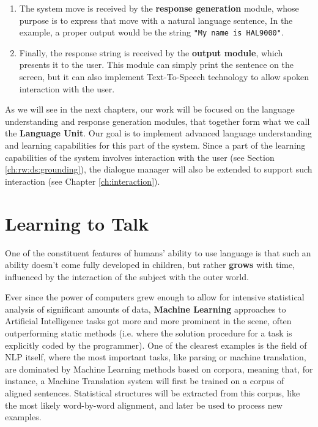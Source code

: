 \begin{enumerate}
	\item The system move is received by the \textbf{response generation} module, whose purpose is to express that move with a natural language sentence, In the example, a proper output would be the string \texttt{"My name is HAL9000"}.
	\item Finally, the response string is received by the \textbf{output module}, which presents it to the user. This module can simply print the sentence on the screen, but it can also implement Text-To-Speech technology to allow spoken interaction with the user.
\end{enumerate}

As we will see in the next chapters, our work will be focused on the language understanding and response generation modules, that together form what we call the \textbf{Language Unit}. Our goal is to implement advanced language understanding and learning capabilities for this part of the system. Since a part of the learning capabilities of the system involves interaction with the user (see Section \ref{ch:rw:ds:grounding}), the dialogue manager will also be extended to support such interaction (see Chapter \ref{ch:interaction}).



\section{Learning to Talk}

One of the constituent features of humans' ability to use language is that such an ability doesn't come fully developed in children, but rather \textbf{grows} with time, influenced by the interaction of the subject with the outer world.

Ever since the power of computers grew enough to allow for intensive statistical analysis of significant amounts of data, \textbf{Machine Learning} approaches to Artificial Intelligence tasks got more and more prominent in the scene, often outperforming static methods (i.e. where the solution procedure for a task is explicitly coded by the programmer).
One of the clearest examples is the field of NLP itself, where the most important tasks, like parsing or machine translation, are dominated by Machine Learning methods based on corpora,
meaning that, for instance, a Machine Translation system will first be trained on a corpus of aligned sentences. Statistical structures will be extracted from this corpus, like the most likely word-by-word alignment, and later be used to process new examples.

